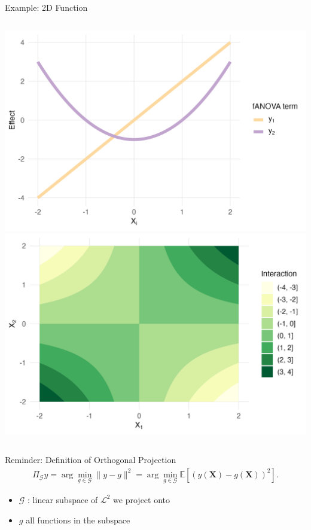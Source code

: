 \begin{frame}{Example: 2D Function} %
  \begin{columns}
      \includegraphics[width=\linewidth]{../images/experiment_section/classical_ex_1_a1p20_a2p00_a11p00_a22p10_a12p10_rhop00_main.png}
      \includegraphics[width=\linewidth]{../images/experiment_section/classical_ex_1_a1p20_a2p00_a11p00_a22p10_a12p10_rhop00_interaction.png}
  \end{columns}
\end{frame}

\begin{frame}{Reminder: Definition of Orthogonal Projection} %
  \begin{align*}
    \Pi_{\mathcal{G}}y = \arg\min_{g \in \mathcal{G}} \|y - g\|^2
= \arg\min_{g \in \mathcal{G}} \mathbb{E}[(y(\boldsymbol{X}) - g(\boldsymbol{X}))^2].
\end{align*}
  \begin{itemize}
    \item $\mathcal{G}$ : linear subspace of $\mathcal{L}^2$ we project onto
    \item $g$ all functions in the subspace
  \end{itemize}
\end{frame}

